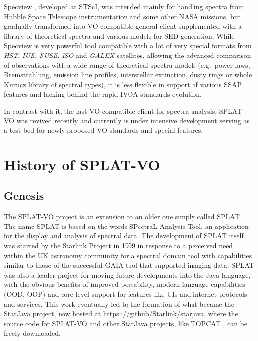 \documentclass[final,authoryear,5p,times,twocolumn]{elsarticle}
\begin{document}
Specview \citep[][]{2002SPIE.4847..410B}, developed at STScI,
was intended mainly for handling spectra from Hubble Space Telescope
instrumentation and some other NASA missions, but gradually transformed into
VO-compatible general client supplemented with a library of theoretical
spectra and various models for SED generation.  While Specview is very
powerful tool  compatible with a lot of very special formats from \emph{HST}, \emph{IUE},
\emph{FUSE}, \emph{ISO} and \emph{GALEX}  satellites, allowing the advanced comparison of
observations with a wide range of theoretical spectra models (e.g.\ power
laws, Bremstrahlung,  emission line profiles,  interstellar extinction, dusty
rings or  whole Kurucz library of spectral types), it is less flexible in
support of various SSAP features and lacking behind the rapid IVOA standards
evolution.

In contrast with it, the last VO-compatible client for spectra analysis,
SPLAT-VO \citep[][]{sun243} was revived recently and currently
is under intensive development serving as a test-bed for newly proposed VO
standards and special features.




\section{History of SPLAT-VO}
\subsection{Genesis}

The SPLAT-VO project is an extension to an older one simply called
SPLAT \citep[][]{2002ASPC..281..513B}.  The name SPLAT
is based on the words SPectraL Analysis Tool, an application for the
display and analysis of spectral data. The development of SPLAT itself
was started by the Starlink Project \citep{1982QJRAS..23..485D} in
1999 in response to a perceived need within the UK astronomy community
for a spectral domain tool with capabilities similar to those of the
successful GAIA tool \citep[][]{2000ASPC..216..615D}
that supported imaging data. SPLAT was also a leader project for
moving future developments into the Java language, with the obvious
benefits of improved portability, modern language capabilities (OOD,
OOP) and core-level support for features like UIs and internet
protocols and services. This work eventually led to the formation of
what became the StarJava project, now hosted at
\url{https:://github/Starlink/starjava}, where the source code for
SPLAT-VO and other StarJava projects, like TOPCAT
\citep[][]{2005ASPC..347...29T}, can be freely
downloaded.
\end{document}
